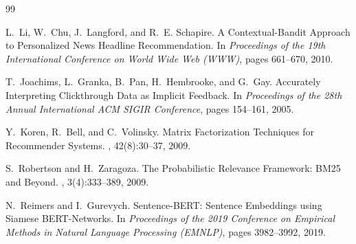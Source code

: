 \documentclass[11pt,a4paper]{article}
\begin{document}
\clearpage
\begingroup
\small
{}
\begin{thebibliography}{99}
\setlength{\itemsep}{4pt}
\setlength{\parskip}{0pt}

L.~Li, W.~Chu, J.~Langford, and R.~E. Schapire.
\newblock A Contextual-Bandit Approach to Personalized News Headline Recommendation.
\newblock In {\em Proceedings of the 19th International Conference on World Wide Web (WWW)}, pages 661--670, 2010.

T.~Joachims, L.~Granka, B.~Pan, H.~Hembrooke, and G.~Gay.
\newblock Accurately Interpreting Clickthrough Data as Implicit Feedback.
\newblock In {\em Proceedings of the 28th Annual International ACM SIGIR Conference}, pages 154--161, 2005.

Y.~Koren, R.~Bell, and C.~Volinsky.
\newblock Matrix Factorization Techniques for Recommender Systems.
, 42(8):30--37, 2009.

S.~Robertson and H.~Zaragoza.
\newblock The Probabilistic Relevance Framework: BM25 and Beyond.
, 3(4):333--389, 2009.

N.~Reimers and I.~Gurevych.
\newblock Sentence-BERT: Sentence Embeddings using Siamese BERT-Networks.
\newblock In {\em Proceedings of the 2019 Conference on Empirical Methods in Natural Language Processing (EMNLP)}, pages 3982--3992, 2019.

\end{thebibliography}
\endgroup
\end{document}
